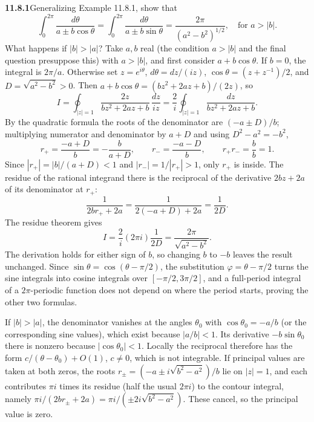 \par\bigskip
\noindent\textbf{11.8.1}\quad Generalizing Example 11.8.1,  show that
\[
\int_{0}^{2\pi}\frac{d\theta}{a\pm b\cos\theta}
=\int_{0}^{2\pi}\frac{d\theta}{a\pm b\sin\theta}
=\frac{2\pi}{(a^{2}-b^{2})^{1/2}},\quad\text{for }a>|b|.
\]
What happens if $|b|>|a|$?
\solution
Take $a,b$ real (the condition $a>|b|$ and the final question
presuppose this) with $a>|b|$, and first consider $a+b\cos\theta$.
If $b=0$, the integral is $2\pi/a$. Otherwise set
$z=e^{i\theta}$, $d\theta=dz/(iz)$, $\cos\theta=(z+z^{-1})/2$, and
$D=\sqrt{a^2-b^2}>0$. Then $a+b\cos\theta=(bz^2+2az+b)/(2z)$, so
\[
I=\oint_{|z|=1}\frac{2z}{bz^2+2az+b}\,\frac{dz}{iz}
=\frac2i\oint_{|z|=1}\frac{dz}{bz^2+2az+b}.
\]
By the quadratic formula the roots of the denominator are $(-a\pm D)/b$;
multiplying numerator and denominator by $a+D$ and using
$D^2-a^2=-b^2$,
\[
r_+=\frac{-a+D}{b}=-\frac b{a+D},\qquad
r_-=\frac{-a-D}{b},\qquad r_+r_-=\frac bb=1.
\]
Since $|r_+|=|b|/(a+D)<1$ and $|r_-|=1/|r_+|>1$, only $r_+$ is inside.
The residue of the rational integrand there is the reciprocal of the
derivative $2bz+2a$ of its denominator at $r_+$:
\[
\frac1{2br_++2a}=\frac1{2(-a+D)+2a}=\frac1{2D}.
\]
The residue theorem gives
\[
\boxed{I=\frac2i(2\pi i)\frac1{2D}
=\frac{2\pi}{\sqrt{a^2-b^2}}}.
\]
The derivation holds for either sign of $b$, so changing $b$ to $-b$
leaves the result unchanged. Since $\sin\theta=\cos(\theta-\pi/2)$,
the substitution $\varphi=\theta-\pi/2$ turns the sine integrals into
cosine integrals over $[-\pi/2,3\pi/2]$, and a full-period integral of
a $2\pi$-periodic function does not depend on where the period starts,
proving the other two formulas.

If $|b|>|a|$, the denominator vanishes at the angles $\theta_0$ with
$\cos\theta_0=-a/b$ (or the corresponding sine values), which exist
because $|a/b|<1$. Its derivative $-b\sin\theta_0$ there is nonzero
because $|\cos\theta_0|<1$. Locally the reciprocal
therefore has the form $c/(\theta-\theta_0)+O(1)$, $c\ne0$, which is
not integrable.
If principal values are taken at both zeros, the roots
$r_\pm=(-a\pm i\sqrt{b^2-a^2})/b$ lie on $|z|=1$, and each contributes
$\pi i$ times its residue (half the usual $2\pi i$) to the contour
integral, namely $\pi i/(2br_\pm+2a)=\pi i/(\pm2i\sqrt{b^2-a^2})$.
These cancel, so the principal value is zero.

